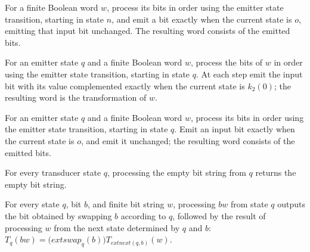 \begin{definition}
\label{BoolCircuit.CktSatReduction.descTail}
\leanok
{}
For a finite Boolean word $w$, process its bits in order using the emitter state
transition, starting in state $n$, and emit a bit exactly when the current state is $o$,
emitting that input bit unchanged. The resulting word consists of the emitted bits.
\end{definition}

\begin{definition}
\label{BoolCircuit.CktSatReduction.T}
\leanok
{}
For an emitter state $q$ and a finite Boolean word $w$, process the bits of $w$ in order
using the emitter state transition, starting in state $q$. At each step emit the input
bit with its value complemented exactly when the current state is $k_2(0)$; the
resulting word is the transformation of $w$.
\end{definition}

\begin{definition}
\label{BoolCircuit.CktSatReduction.S}
\leanok
{}
For an emitter state $q$ and a finite Boolean word $w$, process its bits in order using
the emitter state transition, starting in state $q$. Emit an input bit exactly when the
current state is $o$, and emit it unchanged; the resulting word consists of the emitted
bits.
\end{definition}

\begin{theorem}
\label{BoolCircuit.CktSatReduction.T_nil}
\leanok
{}
For every transducer state $q$, processing the empty bit string from $q$ returns the
empty bit string.
\end{theorem}

\begin{theorem}
\label{BoolCircuit.CktSatReduction.T_cons}
\leanok
{}
For every state $q$, bit $b$, and finite bit string $w$, processing $bw$ from state $q$
outputs the bit obtained by swapping $b$ according to $q$, followed by the result of
processing $w$ from the next state determined by $q$ and $b$:
$T_q(bw)=\bigl(	ext{swap}_q(b)\bigr)T_{	ext{next}(q,b)}(w)$.
\end{theorem}

